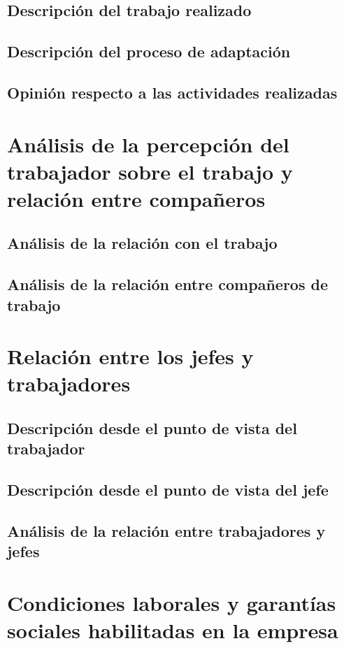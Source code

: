 \subsection{Descripción del trabajo realizado}
\subsection{Descripción del proceso de adaptación}
\subsection{Opinión respecto a las actividades realizadas}

\section{Análisis de la percepción del trabajador sobre el trabajo y relación entre compañeros}
\subsection{Análisis de la relación con el trabajo}
\subsection{Análisis de la relación entre compañeros de trabajo}

\section{Relación entre los jefes y trabajadores}
\subsection{Descripción desde el punto de vista del trabajador}
\subsection{Descripción desde el punto de vista del jefe}
\subsection{Análisis de la relación entre trabajadores y jefes}

\section{Condiciones laborales y garantías sociales habilitadas en la empresa}

